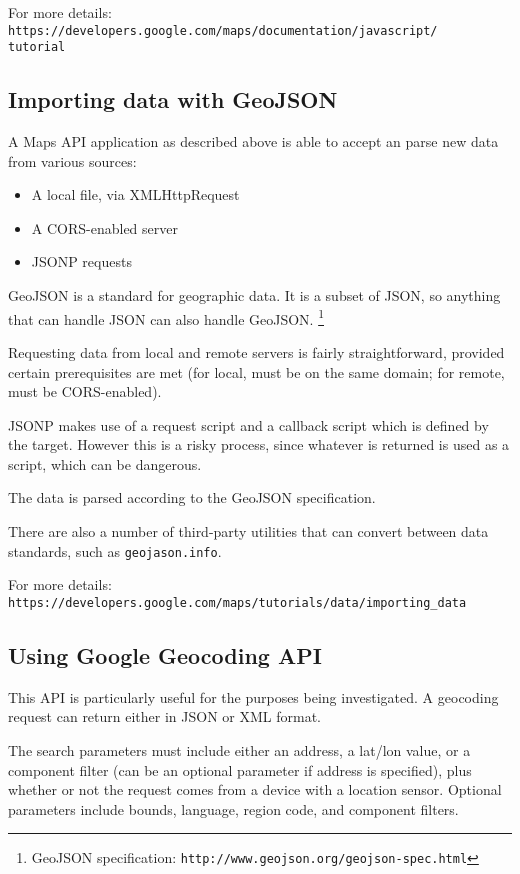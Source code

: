 \documentclass{article}
\begin{document}
For more details:
\noindent\texttt{https://developers.google.com/maps/documentation/javascript/\\tutorial}

\subsection{Importing data with GeoJSON}

A Maps API application as described above is able to accept an parse new data from various sources:
\begin{itemize}
\item A local file, via XMLHttpRequest
\item A CORS-enabled server
\item JSONP requests
\end{itemize}

GeoJSON is a standard for geographic data. It is a subset of JSON, so anything that can handle JSON can also handle GeoJSON. \footnote{GeoJSON specification: \texttt{http://www.geojson.org/geojson-spec.html}}

Requesting data from local and remote servers is fairly straightforward, provided certain prerequisites are met (for local, must be on the same domain; for remote, must be CORS-enabled).

JSONP makes use of a request script and a callback script which is defined by the target. However this is a risky process, since whatever is returned is used as a script, which can be dangerous.

The data is parsed according to the GeoJSON specification.

There are also a number of third-party utilities that can convert between data standards, such as \texttt{geojason.info}.

For more details:
\noindent\verb#https://developers.google.com/maps/tutorials/data/importing_data#

\subsection{Using Google Geocoding API}

This API is particularly useful for the purposes being investigated. A geocoding request can return either in JSON or XML format.

The search parameters must include either an address, a lat/lon value, or a component filter (can be an optional parameter if address is specified), plus whether or not the request comes from a device with a location sensor. Optional parameters include bounds, language, region code, and component filters.
\end{document}
